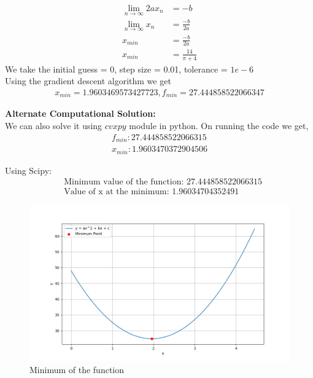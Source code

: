 \documentclass[journal]{IEEEtran}
\numberwithin{equation}{enumi}
\numberwithin{figure}{enumi}
\begin{document}
\begin{itemize}
\begin{align}
        \lim_{n \to \infty}{2ax_n} &= -b\\
        \lim_{n \to \infty}{x_n} &= \frac{-b}{2a}\\
        x_{min} &= \frac{-b}{2a}\\
        x_{min} &= \frac{14}{\pi + 4}
    \end{align}
    We take the initial guess = 0, step size = 0.01, tolerance = $1e - 6$\\
    Using the gradient descent algorithm we get
    \begin{align}
        x_{min} = 1.9603469573427723, f_{min} = 27.444858522066347
    \end{align}
\end{itemize}

\textbf{Alternate Computational Solution: }\\

We can also solve it using $cvxpy$ module in python. On running the code we get,
\begin{align}
    f_{min}: 27.444858522066315\\
    x_{min}: 1.9603470372904506
\end{align}

Using Scipy:\\
\begin{align}
    &\text{Minimum value of the function: }27.444858522066315\\
    &\text{Value of x at the minimum: }1.96034704352491
\end{align}

\begin{figure}[ht]
   \centering
   \includegraphics[width=1\columnwidth]{figs/fig.png}
   \caption{Minimum of the function}
\end{figure}
\end{document}
